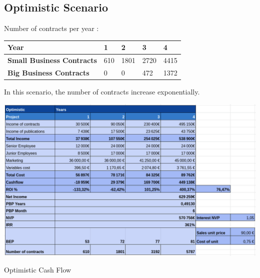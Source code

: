 \documentclass[./main.tex]{subfiles}
\begin{document}
\subsection{Optimistic Scenario}
Number of contracts per year : 
\begin{table}[H]
	\centering
\begin{tabular}{|l|l|l|l|l|}
\hline
\textbf{Year}                     & 1  & 2   & 3   & 4   \\ \hline
\textbf{Small Business Contracts} & 610 & 1801 & 2720 & 4415 \\ \hline
\textbf{Big Business Contracts}   & 0  & 0   & 472  & 1372 \\ \hline
\end{tabular}
\end{table}
In this scenario, the number of contracts increase exponentially.
\begin{table}[H]
	\centering
	\includegraphics[width=14cm]{img/optimistic.png}
	\caption{Optimistic Cash Flow}
	\label{tab:optimistic}
\end{table}
\end{document}
